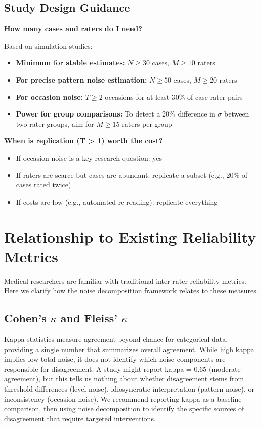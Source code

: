 \documentclass[num-refs]{wiley-article}
\begin{document}
\subsection*{Study Design Guidance}

\textbf{How many cases and raters do I need?}

Based on simulation studies:
\begin{itemize}
    \item \textbf{Minimum for stable estimates:} $N \geq 30$ cases, $M \geq 10$ raters
    \item \textbf{For precise pattern noise estimation:} $N \geq 50$ cases, $M \geq 20$ raters
    \item \textbf{For occasion noise:} $T \geq 2$ occasions for at least 30\% of case-rater pairs
    \item \textbf{Power for group comparisons:} To detect a 20\% difference in $\sigma$ between two rater groups, aim for $M \geq 15$ raters per group
\end{itemize}

\textbf{When is replication (T > 1) worth the cost?}
\begin{itemize}
    \item If occasion noise is a key research question: yes
    \item If raters are scarce but cases are abundant: replicate a subset (e.g., 20\% of cases rated twice)
    \item If costs are low (e.g., automated re-reading): replicate everything
\end{itemize}

\section*{Relationship to Existing Reliability Metrics}\label{section-existing-metrics}

Medical researchers are familiar with traditional inter-rater reliability metrics. Here we clarify how the noise decomposition framework relates to these measures.

\subsection*{Cohen's $\kappa$ and Fleiss' $\kappa$}

Kappa statistics measure agreement beyond chance for categorical data, providing a single number that summarizes overall agreement. While high kappa implies low total noise, it does not identify which noise components are responsible for disagreement. A study might report kappa = 0.65 (moderate agreement), but this tells us nothing about whether disagreement stems from threshold differences (level noise), idiosyncratic interpretation (pattern noise), or inconsistency (occasion noise). We recommend reporting kappa as a baseline comparison, then using noise decomposition to identify the specific sources of disagreement that require targeted interventions.
\end{document}
